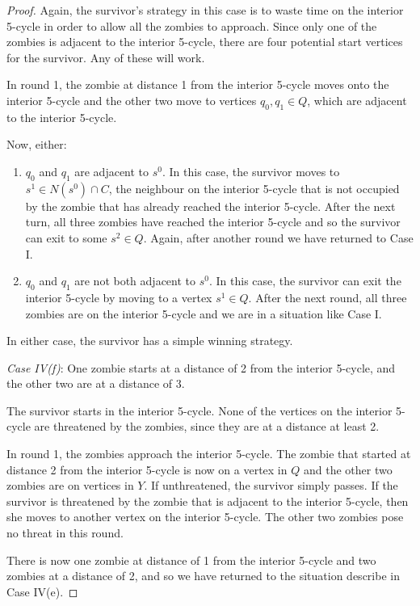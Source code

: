 \begin{proof}
Again, the survivor's strategy in this case is to waste time on the interior 5-cycle in order to allow all the zombies to approach. Since only one of the
zombies is adjacent to the interior 5-cycle, there are four potential start vertices for the survivor. Any of these will work.

In round 1, the zombie at distance 1 from the interior 5-cycle moves onto the interior 5-cycle and the other two move to vertices $q_0, q_1 \in Q$,
which are adjacent to the interior 5-cycle.

Now, either:

\begin{enumerate}
\item $q_0$ and $q_1$ are adjacent to $s^0$. In this case, the survivor moves to $s^1 \in N(s^0) \cap C$, the neighbour on the interior 5-cycle that is not occupied
by the zombie that has already reached the interior 5-cycle. After the next turn, all three zombies have reached the interior 5-cycle and so the survivor can
exit to some $s^2 \in Q$. Again, after another round we have returned to Case I.

\item $q_0$ and $q_1$ are not both adjacent to $s^0$. In this case, the survivor can exit the interior 5-cycle by moving to a vertex $s^1 \in Q$. After the next
round, all three zombies are on the interior 5-cycle and we are in a situation like Case I.
\end{enumerate}

In either case, the survivor has a simple winning strategy.


\textit{Case IV(f)}: One zombie starts at a distance of 2 from the interior 5-cycle, and the other two are at a distance of 3.

The survivor starts in the interior 5-cycle. None of the vertices on the interior 5-cycle are threatened by the zombies, since they are at a distance at least 2.

In round 1, the zombies approach the interior 5-cycle. The zombie that started at distance 2 from the interior 5-cycle is now on a vertex in $Q$ and the other two
zombies are on vertices in $Y$. If unthreatened, the survivor simply passes.
If the survivor is threatened by the zombie that is adjacent to the interior 5-cycle, then she moves to another vertex on the interior 5-cycle. The other two zombies
pose no threat in this round.

There is now one zombie at distance of 1 from the interior 5-cycle and two zombies at a distance of 2, and so we have returned to the situation describe in Case IV(e).


\end{proof}
